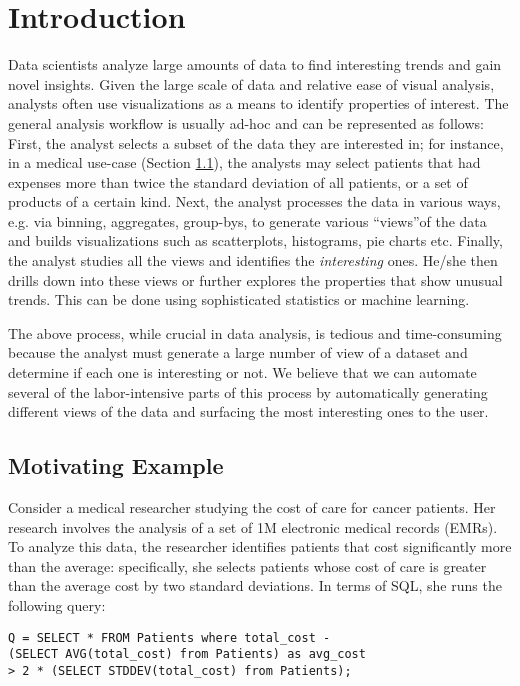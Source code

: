 \section{Introduction}
\label{sec:intro}
Data scientists analyze large amounts of data to find interesting trends and
gain novel insights. Given the large scale of data and relative ease of visual
analysis, analysts often use visualizations as a means to identify properties of
interest. The general analysis workflow is usually ad-hoc and can be represented
as follows: First, the analyst selects a subset of the data they are interested
in; for instance, in a medical use-case (Section
\ref{subsec:motivation_example}), the analysts may select patients that had
expenses more than twice the standard deviation of all patients, or a set of
products of a certain kind. Next, the analyst processes the data in various
ways, e.g. via binning, aggregates, group-bys, to generate various ``views''of
the data and builds visualizations such as scatterplots, histograms, pie charts
etc. Finally, the analyst studies all the views and identifies the {\it
interesting} ones. He/she then drills down into these views or further explores
the properties that show unusual trends. This can be done using sophisticated
statistics or machine learning.

The above process, while crucial in data analysis, is tedious and time-consuming
because the analyst must generate a large number of view of a dataset and
determine if each one is interesting or not. We believe that we can automate
several of the labor-intensive parts of this process by automatically generating
different views of the data and surfacing the most interesting ones to the user.

\subsection{Motivating Example}
\label{subsec:motivation_example}

Consider a medical researcher studying the cost of care for cancer patients. Her
research involves the analysis of a set of 1M electronic medical records (EMRs).
To analyze this data, the researcher identifies patients that cost
significantly more than the average: specifically, she selects patients whose
cost of care is greater than the average cost by two standard deviations. In
terms of SQL, she runs the following query: \\

\noindent 
\begin{small}
\begin{verbatim}
Q = SELECT * FROM Patients where total_cost - 
(SELECT AVG(total_cost) from Patients) as avg_cost
> 2 * (SELECT STDDEV(total_cost) from Patients);
\end{verbatim}
\end{small}


